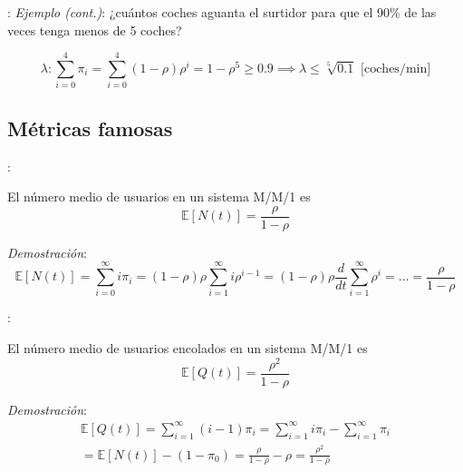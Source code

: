 \documentclass[xcolor={x11names}]{beamer}
\begin{document}
\begin{frame}{\secname: \subsecname}
    \textit{Ejemplo (cont.)}: ¿cuántos coches
    aguanta el surtidor para que el 90\%
    de las veces tenga menos de 5 coches?

    \begin{equation*}
        \lambda: \sum_{i=0}^4 \pi_i = \sum_{i=0}^4 (1-\rho)\rho^i = 1-\rho^5  \geq 0.9
        \implies\lambda\leq \sqrt[5]{0.1} \text{ [coches/min]}
    \end{equation*}

    \begin{figure}
        
    \end{figure}
\end{frame}




\subsection{Métricas famosas}

\begin{frame}{\secname: \subsecname}
    \begin{lemma}
        El número medio de usuarios en
        un sistema M/M/1 es
        \begin{equation}
            \mathbb{E}[N(t)]=\frac{\rho}{1-\rho}
        \end{equation}
    \end{lemma}

    \vfill

    \textit{Demostración}:
    \begin{equation*}
        \mathbb{E}[N(t)]=
        \sum_{i=0}^\infty i \pi_i
        =(1-\rho)\rho \sum_{i=1}^\infty i\rho^{i-1}
        = (1-\rho)\rho \frac{d}{dt}\sum_{i=1}^\infty \rho^i = \ldots = \frac{\rho}{1-\rho}
    \end{equation*}
\end{frame}



\begin{frame}{\secname: \subsecname}
    \begin{lemma}
        El número medio de usuarios encolados
        en un sistema M/M/1 es
        \begin{equation}
            \mathbb{E}[Q(t)]=\frac{\rho^2}{1-\rho}
        \end{equation}

    \end{lemma}

    \vfill
    \textit{Demostración}:
    \begin{multline*}
        \mathbb{E}[Q(t)]=
        \sum_{i=1}^\infty (i-1) \pi_i
        = \sum_{i=1}^\infty i\pi_i -
        \sum_{i=1}^\infty \pi_i\\
        = \mathbb{E}[N(t)] - (1-\pi_0)
        = \frac{\rho}{1-\rho} - \rho
        = \frac{\rho^2}{1-\rho}
    \end{multline*}
\end{frame}
\end{document}
